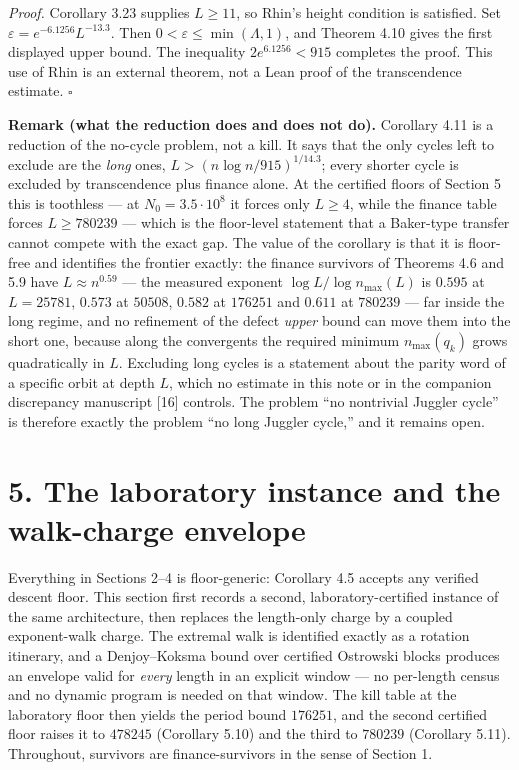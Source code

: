 \documentclass[12pt]{article}
\begin{document}
\emph{Proof.} Corollary 3.23 supplies \(L\ge11\), so Rhin's height
condition is satisfied. Set \(\varepsilon=e^{-6.1256}L^{-13.3}\). Then
\(0<\varepsilon\le\min(\Lambda,1)\), and Theorem 4.10 gives the first
displayed upper bound. The inequality \(2e^{6.1256}<915\) completes the
proof. This use of Rhin is an external theorem, not a Lean proof of the
transcendence estimate. \(\square\)

\textbf{Remark (what the reduction does and does not do).} Corollary
4.11 is a reduction of the no-cycle problem, not a kill. It says that
the only cycles left to exclude are the \emph{long} ones,
\(L>(n\log n/915)^{1/14.3}\); every shorter cycle is excluded by
transcendence plus finance alone. At the certified floors of Section 5
this is toothless --- at \(N_0=3.5\cdot 10^8\) it forces only
\(L\ge 4\), while the finance table forces \(L\ge 780239\) --- which is
the floor-level statement that a Baker-type transfer cannot compete with
the exact gap. The value of the corollary is that it is floor-free and
identifies the frontier exactly: the finance survivors of Theorems 4.6
and 5.9 have \(L\approx n^{0.59}\) --- the measured exponent
\(\log L/\log n_{\max}(L)\) is \(0.595\) at \(L=25781\), \(0.573\) at
\(50508\), \(0.582\) at \(176251\) and \(0.611\) at \(780239\) --- far
inside the long regime, and no refinement of the defect \emph{upper}
bound can move them into the short one, because along the convergents
the required minimum \(n_{\max}(q_k)\) grows quadratically in \(L\).
Excluding long cycles is a statement about the parity word of a specific
orbit at depth \(L\), which no estimate in this note or in the companion
discrepancy manuscript {[}16{]} controls. The problem ``no nontrivial
Juggler cycle'' is therefore exactly the problem ``no long Juggler
cycle,'' and it remains open.

\section{5. The laboratory instance and the walk-charge
envelope}\label{the-laboratory-instance-and-the-walk-charge-envelope}

Everything in Sections 2--4 is floor-generic: Corollary 4.5 accepts any
verified descent floor. This section first records a second,
laboratory-certified instance of the same architecture, then replaces
the length-only charge by a coupled exponent-walk charge. The extremal
walk is identified exactly as a rotation itinerary, and a Denjoy--Koksma
bound over certified Ostrowski blocks produces an envelope valid for
\emph{every} length in an explicit window --- no per-length census and
no dynamic program is needed on that window. The kill table at the
laboratory floor then yields the period bound \(176251\), and the second
certified floor raises it to \(478245\) (Corollary 5.10) and the third
to \(780239\) (Corollary 5.11). Throughout, survivors are
finance-survivors in the sense of Section 1.
\end{document}
